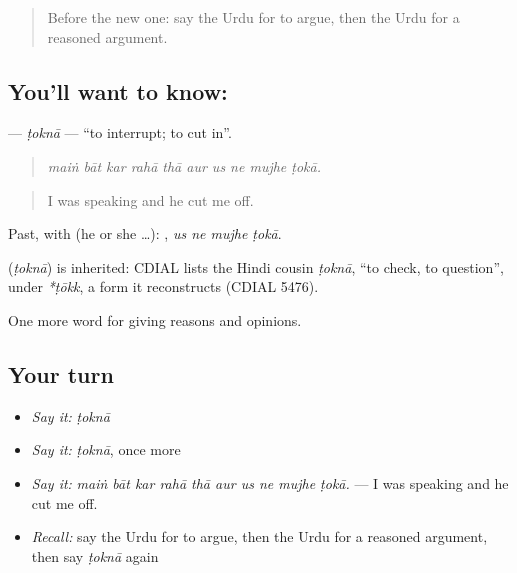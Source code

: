 \begin{quote}
Before the new one: say the Urdu for to argue, then the Urdu for a reasoned argument.
\end{quote}

\subsection*{You'll want to know: }
\textbf{} — \emph{ṭoknā} — \textquotedblleft{}to interrupt; to cut in\textquotedblright{}.

\begin{quote}
         
\end{quote}

\begin{quote}
\emph{maiṅ bāt kar rahā thā aur us ne mujhe ṭokā.}
\end{quote}

\begin{quote}
I was speaking and he cut me off.
\end{quote}

Past, with  (he or she …):    , \emph{us ne mujhe ṭokā}.

\begin{cousinweb}
\textbf{} (\emph{ṭoknā}) is inherited: CDIAL lists the Hindi cousin \emph{ṭoknā}, \textquotedblleft{}to check, to question\textquotedblright{}, under \emph{*ṭōkk}, a form it reconstructs (CDIAL 5476).
\end{cousinweb}

\begin{grammarlens}[title={What you've built}]
One more word for giving reasons and opinions.
\end{grammarlens}

\subsection*{Your turn}
\begin{itemize}
\raggedright
  \item \emph{Say it:} \emph{ṭoknā}
  \item \emph{Say it:} \emph{ṭoknā}, once more
  \item \emph{Say it:} \emph{maiṅ bāt kar rahā thā aur us ne mujhe ṭokā.} — I was speaking and he cut me off.
  \item \emph{Recall:} say the Urdu for to argue, then the Urdu for a reasoned argument, then say \emph{ṭoknā} again
\end{itemize}

